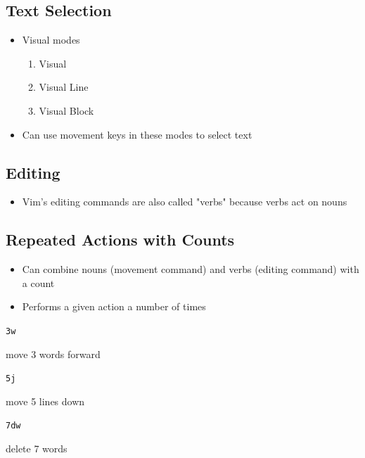 \documentclass[letterpaper,12pt]{article}
\newcommand*{\lstitem}[1]{
  \setbox0\hbox{\lstinline{#1}}
  \item[\usebox0]
}
\begin{document}
\subsection{Text Selection}
\begin{itemize}
 \item Visual modes
       \begin{enumerate}
        \item Visual
        \item Visual Line
        \item Visual Block
       \end{enumerate}
 \item Can use movement keys in these modes to select text
\end{itemize}

\subsection{Editing}
\begin{itemize}
 \item Vim's editing commands are also called "verbs" because verbs act on nouns
\end{itemize}


\subsection{Repeated Actions with Counts}
\begin{itemize}
 \item Can combine nouns (movement command) and verbs (editing command) with a count
 \item Performs a given action a number of times
\end{itemize}

\begin{description}
 \lstitem{3w} move 3 words forward
 \lstitem{5j} move 5 lines down
 \lstitem{7dw} delete 7 words
\end{description}
\end{document}
